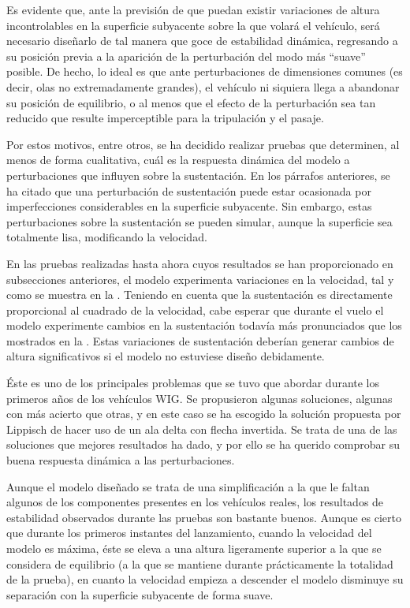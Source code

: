 Es evidente que, ante la previsión de que puedan existir variaciones de altura incontrolables en la superficie subyacente sobre la que volará el vehículo, será necesario diseñarlo de tal manera que goce de estabilidad dinámica, regresando a su posición previa a la aparición de la perturbación del modo más “suave” posible. De hecho, lo ideal es que ante perturbaciones de dimensiones comunes (es decir, olas no extremadamente grandes), el vehículo ni siquiera llega a abandonar su posición de equilibrio, o al menos que el efecto de la perturbación sea tan reducido que resulte imperceptible para la tripulación y el pasaje.

Por estos motivos, entre otros, se ha decidido realizar pruebas que determinen, al menos de forma cualitativa, cuál es la respuesta dinámica del modelo a perturbaciones que influyen sobre la sustentación. En los párrafos anteriores, se ha citado que una perturbación de sustentación puede estar ocasionada por imperfecciones considerables en la superficie subyacente. Sin embargo, estas perturbaciones sobre la sustentación se pueden simular, aunque la superficie sea totalmente lisa, modificando la velocidad.

En las pruebas realizadas hasta ahora cuyos resultados se han proporcionado en subsecciones anteriores, el modelo experimenta variaciones en la velocidad, tal y como se muestra en la . Teniendo en cuenta que la sustentación es directamente proporcional al cuadrado de la velocidad, cabe esperar que durante el vuelo el modelo experimente cambios en la sustentación todavía más pronunciados que los mostrados en la . Estas variaciones de sustentación deberían generar cambios de altura significativos si el modelo no estuviese diseño debidamente.

Éste es uno de los principales problemas que se tuvo que abordar durante los primeros años de los vehículos WIG. Se propusieron algunas soluciones, algunas con más acierto que otras, y en este caso se ha escogido la solución propuesta por Lippisch de hacer uso de un ala delta con flecha invertida. Se trata de una de las soluciones que mejores resultados ha dado, y por ello se ha querido comprobar su buena respuesta dinámica a las perturbaciones.

Aunque el modelo diseñado se trata de una simplificación a la que le faltan algunos de los componentes presentes en los vehículos reales, los resultados de estabilidad observados durante las pruebas son bastante buenos. Aunque es cierto que durante los primeros instantes del lanzamiento, cuando la velocidad del modelo es máxima, éste se eleva a una altura ligeramente superior a la que se considera de equilibrio (a la que se mantiene durante prácticamente la totalidad de la prueba), en cuanto la velocidad empieza a descender el modelo disminuye su separación con la superficie subyacente de forma suave.

